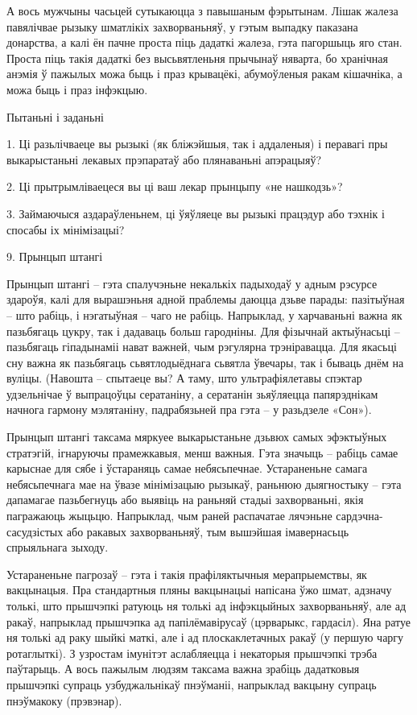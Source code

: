 А вось мужчыны часьцей сутыкаюцца з павышаным фэрытынам. Лішак жалеза павялічвае рызыку шматлікіх захворваньняў, у гэтым выпадку паказана донарства, а калі ён пачне проста піць дадаткі жалеза, гэта пагоршыць яго стан. Проста піць такія дадаткі без высьвятленьня прычынаў няварта, бо хранічная анэмія ў пажылых можа быць і праз крывацёкі, абумоўленыя ракам кішачніка, а можа быць і праз інфэкцыю.

Пытаньні і заданьні

1. Ці разьлічваеце вы рызыкі (як бліжэйшыя, так і аддаленыя) і перавагі пры выкарыстаньні лекавых прэпаратаў або плянаваньні апэрацыяў?

2. Ці прытрымліваецеся вы ці ваш лекар прынцыпу «не нашкодзь»?

3. Займаючыся аздараўленьнем, ці ўяўляеце вы рызыкі працэдур або тэхнік і спосабы іх мінімізацыі?


9. Прынцып штангі

Прынцып штангі – гэта спалучэньне некалькіх падыходаў у адным рэсурсе здароўя, калі для вырашэньня адной праблемы даюцца дзьве парады: пазітыўная – што рабіць, і нэгатыўная – чаго не рабіць. Напрыклад, у харчаваньні важна як пазьбягаць цукру, так і дадаваць больш гародніны. Для фізычнай актыўнасьці – пазьбягаць гіпадынаміі нават важней, чым рэгулярна трэніравацца. Для якасьці сну важна як пазьбягаць сьвятлодыёднага сьвятла ўвечары, так і бываць днём на вуліцы. (Навошта – спытаеце вы? А таму, што ультрафіялетавы спэктар удзельнічае ў выпрацоўцы сератаніну, а сератанін зьяўляецца папярэднікам начнога гармону мэлятаніну, падрабязьней пра гэта – у разьдзеле «Сон»).

Прынцып штангі таксама мяркуее выкарыстаньне дзьвюх самых эфэктыўных стратэгій, ігнаруючы прамежкавыя, менш важныя. Гэта значыць – рабіць самае карыснае для сябе і ўстараняць самае небясьпечнае. Устараненьне самага небясьпечнага мае на ўвазе мінімізацыю рызыкаў, раньнюю дыягностыку – гэта дапамагае пазьбегнуць або выявіць на раньняй стадыі захворваньні, якія пагражаюць жыцьцю. Напрыклад, чым раней распачатае лячэньне сардэчна-сасудзістых або ракавых захворваньняў, тым вышэйшая імавернасьць спрыяльнага зыходу.

Устараненьне пагрозаў – гэта і такія прафіляктычныя мерапрыемствы, як вакцынацыя. Пра стандартныя пляны вакцынацыі напісана ўжо шмат, адзначу толькі, што прышчэпкі ратуюць ня толькі ад інфэкцыйных захворваньняў, але ад ракаў, напрыклад прышчэпка ад папілёмавірусаў (цэрварыкс, гардасіл). Яна ратуе ня толькі ад раку шыйкі маткі, але і ад плоскаклетачных ракаў (у першую чаргу ротаглыткі). З узростам імунітэт аслабляецца і некаторыя прышчэпкі трэба паўтарыць. А вось пажылым людзям таксама важна зрабіць дадатковыя прышчэпкі супраць узбуджальнікаў пнэўманіі, напрыклад вакцыну супраць пнэўмакоку (прэвэнар).

